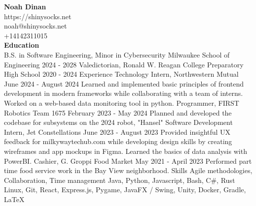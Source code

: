 \documentclass[12pt]{article}
\begin{document}
\textbf{Noah Dinan}\\[1cm]

https://shinysocks.net\\
noah@shinysocks.net\\
+14142311015\\

\textbf{Education}\\
B.S. in Software Engineering, Minor in Cybersecurity
Milwaukee School of Engineering
2024 - 2028
Valedictorian, Ronald W. Reagan College Preparatory High School
2020 - 2024
Experience
Technology Intern, Northwestern Mutual
June 2024 - August 2024
Learned and implemented basic principles of frontend development in modern frameworks while
collaborating with a team of interns. Worked on a web-based data monitoring tool in python.
Programmer, FIRST Robotics Team 1675
February 2023 - May 2024
Planned and developed the codebase for subsystems on the 2024 robot, "Hansel"
Software Development Intern, Jet Constellations
June 2023 - August 2023
Provided insightful UX feedback for milkywaytechub.com while developing design skills by
creating wireframes and app mockups in Figma. Learned the basics of data analysis with PowerBI.
Cashier, G. Groppi Food Market
May 2021 - April 2023
Performed part time food service work in the Bay View neighborhood.
Skills
Agile methodologies, Collaboration, Time management
Java, Python, Javascript, Bash, C\#, Rust
Linux, Git, React, Express.js, Pygame, JavaFX / Swing, Unity, Docker, Gradle, LaTeX
\end{document}
